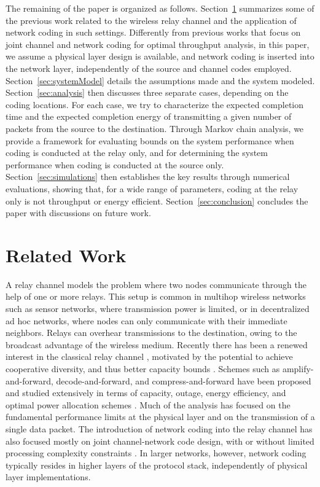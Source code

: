 \documentclass[journal, letterpaper]{IEEEtran}
\begin{document}
The remaining of the paper is organized as follows. Section~\ref{sec:relatedWork} summarizes some of the previous work related to the wireless relay channel and the application of network coding in such settings. Differently from previous works that focus on joint channel and network coding for optimal throughput analysis, in this paper, we assume a physical layer design is available, and network coding is inserted into the network layer, independently of the source and channel codes employed. Section~\ref{sec:systemModel} details the assumptions made and the system modeled. Section~\ref{sec:analysis} then discusses three separate cases, depending on the coding locations. For each case, we try to characterize the expected completion time and the expected completion energy of transmitting a given number of packets from the source to the destination. Through Markov chain analysis, we provide a framework for evaluating bounds on the system performance when coding is conducted at the relay only, and for determining the system performance when coding is conducted at the source only. Section~\ref{sec:simulations} then establishes the key results through numerical evaluations, showing that, for a wide range of parameters, coding at the relay only is not throughput or energy efficient. Section~\ref{sec:conclusion} concludes the paper with discussions on future work.

\section{Related Work}\label{sec:relatedWork}
A relay channel models the problem where two nodes communicate through the help of one or more relays. This setup is common in multihop wireless networks such as sensor networks, where transmission power is limited, or in decentralized ad hoc networks, where nodes can only communicate with their immediate neighbors. Relays can overhear transmissions to the destination, owing to the broadcast advantage of the wireless medium. Recently there has been a renewed interest in the classical relay channel \cite{van1968transmission, cover1979capacity}, motivated by the potential to achieve cooperative diversity, and thus better capacity bounds \cite{laneman2004cooperative, kramer2005cooperative,lai2006three, dana2006capacity}. Schemes such as amplify-and-forward, decode-and-forward, and compress-and-forward have been proposed and studied extensively in terms of capacity, outage, energy efficiency, and optimal power allocation schemes \cite{yao2005energy, zhao2007improving}. Much of the analysis has focused on the fundamental performance limits at the physical layer and on the transmission of a single data packet. The introduction of network coding into the relay channel has also focused mostly on joint channel-network code design, with or without limited processing complexity constraints \cite{hausl2006iterative, xiao2007network, zhang2009channel, yang2007network, tuninetti2005throughput, tuninetti2004processing}. In larger networks, however, network coding typically resides in higher layers of the protocol stack, independently of physical layer implementations.
\end{document}
